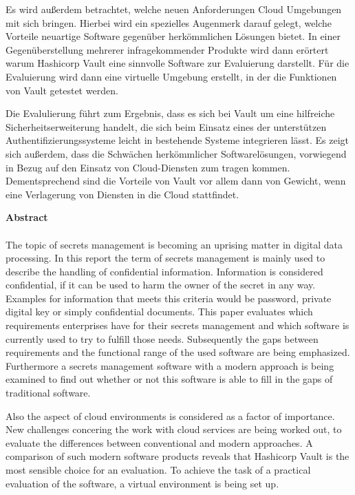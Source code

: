 \documentclass[
book,
a4paper,   
titlepage,  
halfparskip,
12pt        
]{scrartcl}
\begin{document}
Es wird außerdem betrachtet, welche neuen
Anforderungen Cloud Umgebungen mit sich bringen. Hierbei wird ein spezielles Augenmerk darauf gelegt,
welche Vorteile neuartige Software gegenüber herkömmlichen Lösungen bietet. 
In einer Gegenüberstellung mehrerer infragekommender Produkte wird dann erörtert warum Hashicorp Vault
eine sinnvolle Software zur Evaluierung darstellt. Für die Evaluierung wird dann eine virtuelle 
Umgebung erstellt, in der die Funktionen von Vault getestet werden.

Die Evalulierung führt zum Ergebnis, dass es sich bei Vault um eine hilfreiche Sicherheitserweiterung handelt,
die sich beim Einsatz eines der unterstützen Authentifizierungssysteme leicht in bestehende Systeme integrieren lässt.
Es zeigt sich außerdem, dass die Schwächen herkömmlicher Softwarelösungen, vorwiegend in Bezug auf den Einsatz von Cloud-Diensten zum tragen kommen. Dementsprechend sind die Vorteile von Vault vor allem dann von Gewicht, wenn eine Verlagerung von Diensten in die Cloud stattfindet.
\newpage
\thispagestyle{empty}

\large{\textbf{Abstract}}\\
\\
The topic of secrets management is becoming an uprising matter in digital data processing.
In this report the term of secrets management is mainly used to describe the handling of confidential information.
Information is considered confidential, if it can be used to harm the owner of the secret in any way.  
Examples for information that meets this criteria would be password, private digital key or simply confidential documents.
This paper evaluates which requirements enterprises have for their secrets management and which software is currently used to try to fulfill those needs.
Subsequently the gaps between requirements and the functional range of the used software are being emphasized.
Furthermore a secrets management software with a modern approach is being examined to find out whether or not this software is able to fill in the gaps of traditional software.

Also the aspect of cloud environments is considered as a factor of importance. New challenges concering the work with cloud services are being worked out, to evaluate the differences between conventional and modern approaches. A comparison of such modern software products reveals that Hashicorp Vault is the most sensible choice for an evaluation. To achieve the task of a practical evaluation of the software, a virtual environment is being set up.
\end{document}
